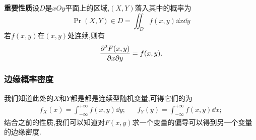 \textbf{重要性质}\quad 设$D$是$xOy$平面上的区域,$(X,Y )$落入其中的概率为
\begin{equation}
    \Pr{(X,Y)\in D} = \iint_D f(x,y)\dd{x}\dd{y}
\end{equation}
若$f(x,y)$在$(x,y )$处连续,则有
\begin{equation}
    \pdv{F(x,y)}{x}{y} = f(x,y).
\end{equation}
\subsubsection{边缘概率密度}\label{sec:marginPDF}
我们知道此处的$X$和$Y$都是都是连续型随机变量,可得它们的为
\begin{align}
    f_X(x)=\int_{-\infty}^{+\infty}f(x,y )\dd{y}; &  & f_Y(y)=\int_{-\infty}^{+\infty}f(x,y )\dd{x};
    \label{eq:3.12}
\end{align}
结合之前的性质,我们可以知道对$F(x,y)$求一个变量的偏导可以得到另一个变量的边缘密度.
